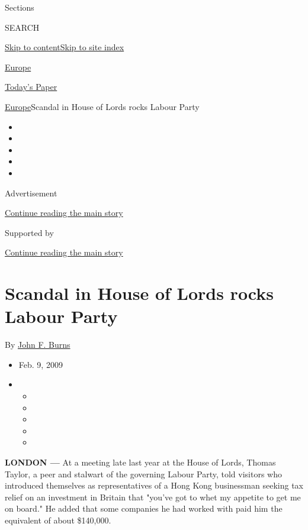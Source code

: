 Sections

SEARCH

\protect\hyperlink{site-content}{Skip to
content}\protect\hyperlink{site-index}{Skip to site index}

\href{https://www.nytimes.com/section/world/europe}{Europe}

\href{https://myaccount.nytimes.com/auth/login?response_type=cookie\&client_id=vi}{}

\href{https://www.nytimes.com/section/todayspaper}{Today's Paper}

\href{/section/world/europe}{Europe}\textbar{}Scandal in House of Lords
rocks Labour Party

\begin{itemize}
\item
\item
\item
\item
\item
\end{itemize}

Advertisement

\protect\hyperlink{after-top}{Continue reading the main story}

Supported by

\protect\hyperlink{after-sponsor}{Continue reading the main story}

\hypertarget{scandal-in-house-of-lords-rocks-labour-party}{%
\section{Scandal in House of Lords rocks Labour
Party}\label{scandal-in-house-of-lords-rocks-labour-party}}

By \href{https://www.nytimes.com/by/john-f-burns}{John F. Burns}

\begin{itemize}
\item
  Feb. 9, 2009
\item
  \begin{itemize}
  \item
  \item
  \item
  \item
  \item
  \end{itemize}
\end{itemize}

\textbf{LONDON ---} At a meeting late last year at the House of Lords,
Thomas Taylor, a peer and stalwart of the governing Labour Party, told
visitors who introduced themselves as representatives of a Hong Kong
businessman seeking tax relief on an investment in Britain that "you've
got to whet my appetite to get me on board." He added that some
companies he had worked with paid him the equivalent of about \$140,000.

